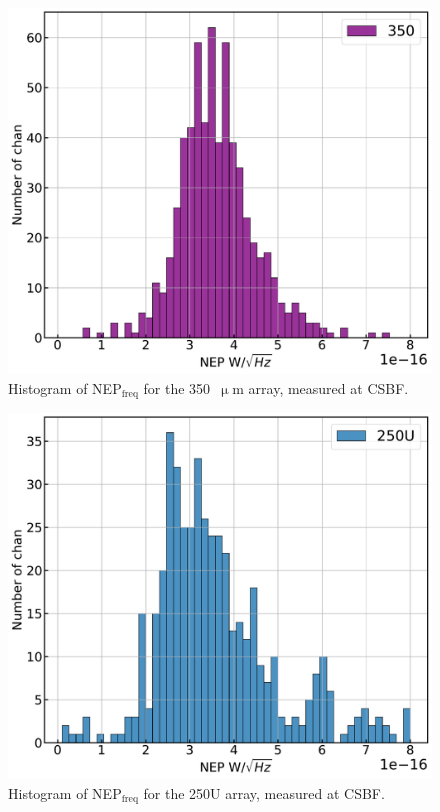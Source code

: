 \begin{figure}[!htbp]
\centering
\includegraphics[width=\textwidth]{figures/blast_data/hist/PAL_NEP_hist_R3}
\caption[~Histogram of  for the 350~ array, measured at CSBF.]{Histogram of NEP$_{\mathrm{freq}}$ for the 350~$\upmu$m array, measured at CSBF.}
\label{fig:pal nep 350}
\end{figure}

\begin{figure}[!htbp]
\centering
\includegraphics[width=\textwidth]{figures/blast_data/hist/PAL_NEP_hist_R4}
\caption[~Histogram of  for the 250U array, measured at CSBF.]{Histogram of NEP$_{\mathrm{freq}}$ for the 250U array, measured at CSBF.}
\label{fig:pal nep 250U}
\end{figure}

